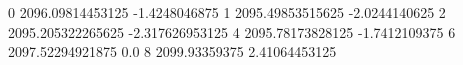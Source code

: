0 2096.09814453125 -1.4248046875
1 2095.49853515625 -2.0244140625
2 2095.205322265625 -2.317626953125
4 2095.78173828125 -1.7412109375
6 2097.52294921875 0.0
8 2099.93359375 2.41064453125
